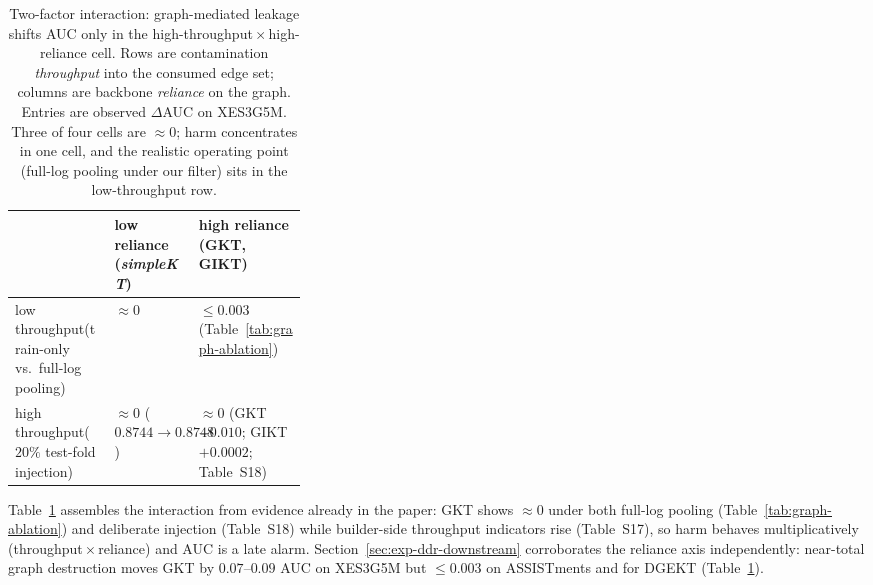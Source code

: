 \documentclass[pdflatex,sn-mathphys-num]{sn-jnl}
\begin{document}
\begin{table}[t]
\centering
\caption{Two-factor interaction: graph-mediated leakage shifts AUC only in the
high-throughput\,$\times$\,high-reliance cell. Rows are contamination
\emph{throughput} into the consumed edge set; columns are backbone
\emph{reliance} on the graph. Entries are observed $\Delta$AUC on XES3G5M.
Three of four cells are ${\approx}0$; harm concentrates in one cell, and the
realistic operating point (full-log pooling under our filter) sits in the
low-throughput row.}
\label{tab:two-factor}
\footnotesize
\setlength{\tabcolsep}{4pt}
\begin{tabularx}{\linewidth}{@{} >{\RaggedRight\arraybackslash}p{0.34\linewidth}
  >{\centering\arraybackslash}X >{\centering\arraybackslash}X @{}}
\toprule
 & low reliance (\textit{simpleKT}) & high reliance (GKT, GIKT) \\
\midrule
low throughput\newline (train-only vs.\ full-log pooling) &
  ${\approx}0$ &
  ${\leq}0.003$ (Table~\ref{tab:graph-ablation}) \\
high throughput\newline ($20\%$ test-fold injection) &
  ${\approx}0$ ($0.8744{\to}0.8748$) &
  ${\approx}0$ (GKT $-0.010$; GIKT $+0.0002$; Table~S18) \\
\bottomrule
\end{tabularx}
\end{table}

Table~\ref{tab:two-factor} assembles the interaction from evidence already in
the paper: GKT shows ${\approx}0$ under both full-log pooling
(Table~\ref{tab:graph-ablation}) and deliberate injection (Table~S18) while
builder-side throughput indicators rise (Table~S17), so harm behaves
multiplicatively (throughput\,$\times$\,reliance) and AUC is a late alarm.
Section~\ref{sec:exp-ddr-downstream} corroborates the reliance axis
independently: near-total graph destruction moves GKT by $0.07$--$0.09$ AUC on
XES3G5M but ${\le}0.003$ on ASSISTments and for DGEKT
(Table~\ref{tab:two-factor}).
\end{document}
